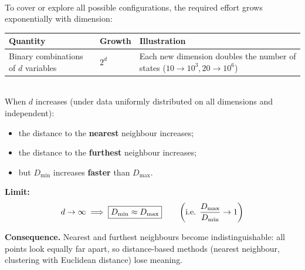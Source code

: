 \documentclass[10pt,a4paper]{article}
\begin{document}
\vspace{3pt}
\\[3pt]
To cover or explore all possible configurations, the required effort grows exponentially with dimension:
\begin{center}
\small
\begin{tabular}{lll}
\toprule
\rowcolor{lightbg}
\textbf{Quantity} & \textbf{Growth} & \textbf{Illustration} \\
\midrule
Binary combinations of $d$ variables & $2^d$ & Each new dimension doubles the number of states ($10 \to 10^3, 20 \to 10^6$) \\
\bottomrule
\end{tabular}
\end{center}

\vspace{5pt}

\\[4pt]
When $d$ increases (under data uniformly distributed on all dimensions and independent):
\begin{itemize}[leftmargin=14pt, itemsep=2pt, topsep=2pt]
    \item the distance to the \textbf{nearest} neighbour increases;
    \item the distance to the \textbf{furthest} neighbour increases;
    \item but $D_{\min}$ increases \textbf{faster} than $D_{\max}$.
\end{itemize}
\textbf{Limit:}
\[
d \to \infty \implies \fbox{$D_{\min} \approx D_{\max}$} \qquad \left(\text{i.e. } \frac{D_{\max}}{D_{\min}} \to 1\right)
\]
\begin{tcolorbox}[
    colframe=accentred,
    colback=white,
    arc=1.5mm,
    boxrule=0.5pt,
    left=8pt, right=8pt, top=5pt, bottom=5pt
]
\textbf{\color{accentred}Consequence.} Nearest and furthest neighbours become indistinguishable: all points look equally far apart, so distance-based methods (nearest neighbour, clustering with Euclidean distance) lose meaning.
\end{tcolorbox}

\vspace{6pt}
\end{document}
